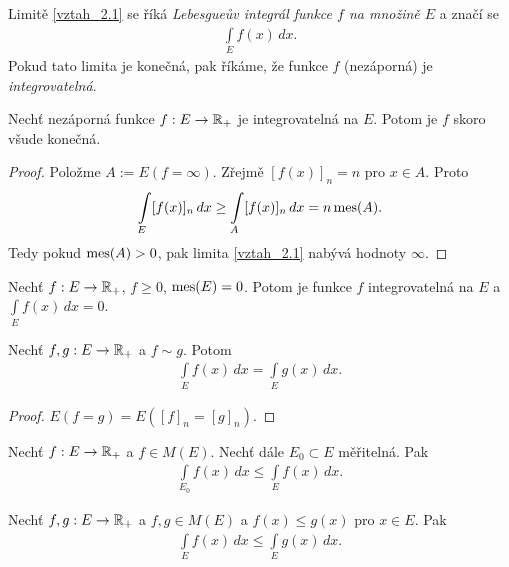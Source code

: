 \begin{definition}
Limitě \eqref{vztah_2.1} se říká \textit{Lebesgue\r uv integrál funkce $f$ na množině $E$} a značí se
\begin{align*}
\int \limits _E f(x) \, dx.
\end{align*}
Pokud tato limita je konečná, pak říkáme, že funkce $f$ (nezáporná) je \textit{integrovatelná}.
\label{Lebesgue_int}
\end{definition}



\begin{theorem}
Nechť nezáporná funkce $f:E \to \mathbb{R}_+$ je integrovatelná na $E$. Potom je $f$ skoro všude konečná.
\end{theorem}

\begin{proof}
Položme $A:=E(f=\infty)$. Zřejmě $[f(x)]_n=n$ pro $x \in A$. Proto 
\begin{align*}
\int \limits _E [f(x)]_n \, dx \geq \int \limits _A [f(x)]_n \, dx = n \operatorname{mes}(A).
\end{align*}
Tedy pokud $\operatorname{mes}(A)>0$, pak limita \eqref{vztah_2.1} nabývá hodnoty $\infty$.
\end{proof}

\begin{theorem}
Nechť $f:E \to \mathbb{R}_+$, $f \geq 0$, $\operatorname{mes}(E)=0$. Potom je funkce $f$ integrovatelná na $E$ a $\int \limits _E f(x) \, dx=0$.
\end{theorem}


\begin{theorem}
Nechť $f,g:E \to \mathbb{R}_+$ a $f \sim g$. Potom 
\begin{align*}
\int \limits _E f(x) \, dx= \int \limits _E g(x) \, dx.
\end{align*}
\end{theorem}
\begin{proof}
$E(f=g)=E([f]_n=[g]_n)$.
\end{proof}

\begin{theorem}
Nechť $f:E \to \mathbb{R}_+$ a $f \in M(E)$. Nechť dále $E_0 \subset E$ měřitelná. Pak 
\begin{align*}
\int \limits _{E_0} f(x) \, dx \leq \int \limits _{E} f(x) \, dx.
\end{align*}
\end{theorem}

\begin{theorem}
Nechť $f,g:E \to \mathbb{R}_+$ a $f,g \in M(E)$ a $f(x) \leq g(x)$ pro $x \in E$. Pak 
\begin{align*}
\int \limits _{E} f(x) \, dx \leq \int \limits _{E} g(x) \, dx.
\end{align*}
\end{theorem}

